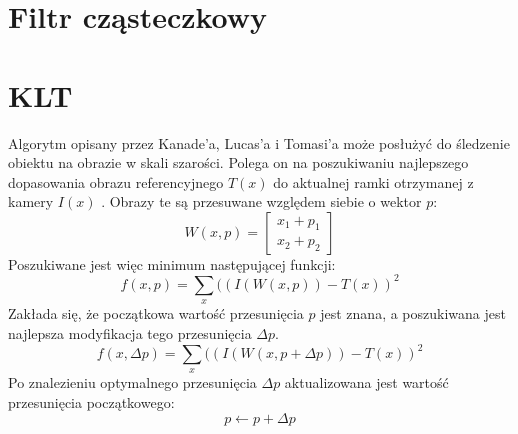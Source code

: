 
\section{Filtr cząsteczkowy}
\label{sec:filtrczasteczkowy}

\section{KLT}
\label{sec:klt}
Algorytm opisany przez Kanade'a, Lucas'a i Tomasi'a może posłużyć do śledzenie obiektu na obrazie w skali szarości. Polega on na poszukiwaniu najlepszego dopasowania obrazu referencyjnego \(T(x)\) do aktualnej ramki otrzymanej z kamery \(I(x)\) \cite{TSK}. Obrazy te są przesuwane względem siebie o wektor \(p\):
\begin{equation}
W(x,p)=
	\begin{bmatrix}
	x_1+p_1 \\
	x_2+p_2
	\end{bmatrix}
\end{equation}
Poszukiwane jest więc minimum następującej funkcji:
\begin{equation}
f(x,p)=\sum\limits_{x}((I(W(x,p))-T(x))^2
\end{equation}
Zakłada się, że początkowa wartość przesunięcia \(p\) jest znana, a poszukiwana jest najlepsza modyfikacja tego przesunięcia \(\Delta p\).
\begin{equation}
f(x,\Delta p)=\sum\limits_{x}((I(W(x,p+\Delta p))-T(x))^2
\end{equation}
Po znalezieniu optymalnego przesunięcia \(\Delta p\) aktualizowana jest wartość przesunięcia początkowego:
\begin{equation}
p \leftarrow p+\Delta p
\end{equation}
